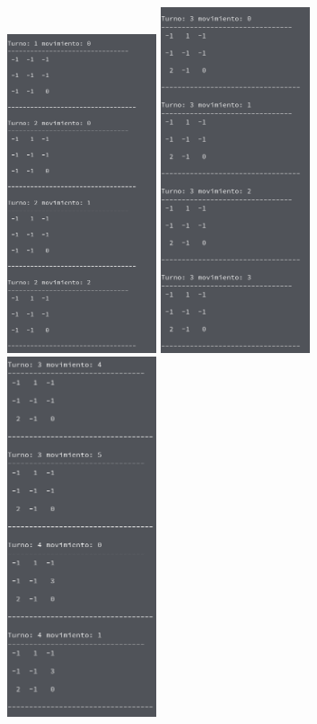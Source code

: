 \documentclass[a4paper, 11pt]{article}
\begin{document}
				\includegraphics[width=0.33\textwidth]{a.png}
				\includegraphics[width=0.33\textwidth]{b.png}								
				\includegraphics[width=0.33\textwidth]{c.png}
				
\end{document}
